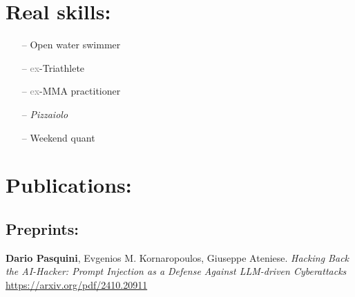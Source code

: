 \documentclass[margin, 10pt]{article} %
\begin{document}



\section*{Real skills:}  
\begin{itemize}
	\itemsep0em 
	\item[--] Open water swimmer 
	\item[--]  \textcolor{gray}{ex}-Triathlete
	\item[--]  \textcolor{gray}{ex}-MMA practitioner
\ifita
\else
	\item[--]  \textit{Pizzaiolo}
	\item[--]  Weekend quant
\fi
\end{itemize}

\noindent\makebox[\linewidth]{\rule{.2\paperwidth}{0.3pt}}

\noindent\section*{Publications:}

\subsection*{Preprints:}
\vspace{.5cm}
\let\oldsection\section
\renewcommand{\section}[2]{}
\begin{thebibliography}{99}
\setcounter{enumiv}{7} 
	
	
	\textbf{Dario Pasquini},  Evgenios M. Kornaropoulos, Giuseppe Ateniese. \textit{Hacking Back the AI-Hacker: Prompt Injection as a Defense Against LLM-driven Cyberattacks} \url{https://arxiv.org/pdf/2410.20911}
	
	

 \end{thebibliography}
\end{document}

